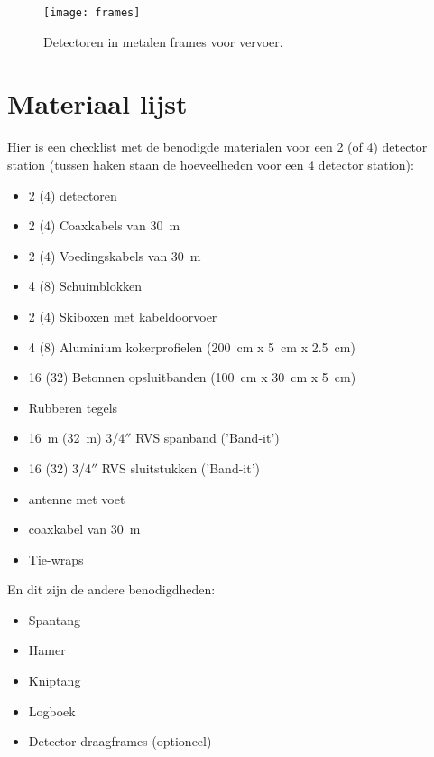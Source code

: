 \begin{figure}
    \centering
    \texttt{[image: frames]}
    \caption{Detectoren in metalen frames voor vervoer.}
    \label{fig:frames}
\end{figure}


\section{Materiaal lijst}

Hier is een checklist met de benodigde materialen voor een 2 (of 4) detector
station (tussen haken staan de hoeveelheden voor een 4 detector station):

\begin{itemize}
    \item 2 (4) \hisparc detectoren
    \item 2 (4) Coaxkabels van \SI{30}{\meter}
    \item 2 (4) Voedingskabels van \SI{30}{\meter}
    \item 4 (8) Schuimblokken
    \item 2 (4) Skiboxen met kabeldoorvoer
    \item 4 (8) Aluminium kokerprofielen (\SI{200}{\centi\meter} x
    \SI{5}{\centi\meter} x \SI{2.5}{\centi\meter})
    \item 16 (32) Betonnen opsluitbanden (\SI{100}{\centi\meter} x
    \SI{30}{\centi\meter} x \SI{5}{\centi\meter})
    \item Rubberen tegels
    \item \SI{16}{\meter} (\SI{32}{\meter}) 3/4$''$ RVS spanband
    ('Band-it')
    \item 16 (32) 3/4$''$ RVS sluitstukken ('Band-it')
    \item \gps antenne met voet
    \item \gps coaxkabel van \SI{30}{\meter}
    \item Tie-wraps
\end{itemize}

En dit zijn de andere benodigdheden:

\begin{itemize}
    \item Spantang
    \item Hamer
    \item Kniptang
    \item Logboek
    \item Detector draagframes (optioneel)
\end{itemize}



